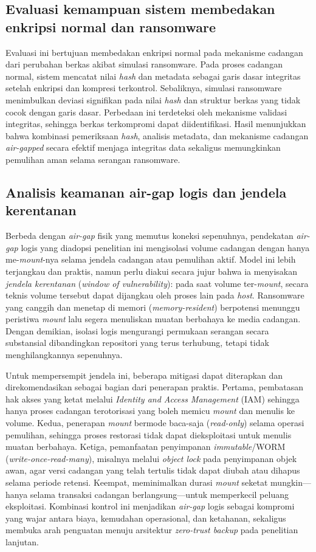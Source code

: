 \documentclass{iaesarticle}
\begin{document}
\subsection{Evaluasi kemampuan sistem membedakan enkripsi normal dan ransomware}
Evaluasi ini bertujuan membedakan enkripsi normal pada mekanisme cadangan dari perubahan berkas akibat simulasi ransomware. Pada proses cadangan normal, sistem mencatat nilai \textit{hash} dan metadata sebagai garis dasar integritas setelah enkripsi dan kompresi terkontrol. Sebaliknya, simulasi ransomware menimbulkan deviasi signifikan pada nilai \textit{hash} dan struktur berkas yang tidak cocok dengan garis dasar. Perbedaan ini terdeteksi oleh mekanisme validasi integritas, sehingga berkas terkompromi dapat diidentifikasi. Hasil menunjukkan bahwa kombinasi pemeriksaan \textit{hash}, analisis metadata, dan mekanisme cadangan \textit{air-gapped} secara efektif menjaga integritas data sekaligus memungkinkan pemulihan aman selama serangan ransomware.

\subsection{Analisis keamanan air-gap logis dan jendela kerentanan}
Berbeda dengan \textit{air-gap} fisik yang memutus koneksi sepenuhnya, pendekatan \textit{air-gap} logis yang diadopsi penelitian ini mengisolasi volume cadangan dengan hanya me-\textit{mount}-nya selama jendela cadangan atau pemulihan aktif. Model ini lebih terjangkau dan praktis, namun perlu diakui secara jujur bahwa ia menyisakan \textit{jendela kerentanan} (\textit{window of vulnerability}): pada saat volume ter-\textit{mount}, secara teknis volume tersebut dapat dijangkau oleh proses lain pada \textit{host}. Ransomware yang canggih dan menetap di memori (\textit{memory-resident}) berpotensi menunggu peristiwa \textit{mount} lalu segera menuliskan muatan berbahaya ke media cadangan. Dengan demikian, isolasi logis mengurangi permukaan serangan secara substansial dibandingkan repositori yang terus terhubung, tetapi tidak menghilangkannya sepenuhnya.

Untuk mempersempit jendela ini, beberapa mitigasi dapat diterapkan dan direkomendasikan sebagai bagian dari penerapan praktis. Pertama, pembatasan hak akses yang ketat melalui \textit{Identity and Access Management} (IAM) sehingga hanya proses cadangan terotorisasi yang boleh memicu \textit{mount} dan menulis ke volume. Kedua, penerapan \textit{mount} bermode baca-saja (\textit{read-only}) selama operasi pemulihan, sehingga proses restorasi tidak dapat dieksploitasi untuk menulis muatan berbahaya. Ketiga, pemanfaatan penyimpanan \textit{immutable}/WORM (\textit{write-once-read-many}), misalnya melalui \textit{object lock} pada penyimpanan objek awan, agar versi cadangan yang telah tertulis tidak dapat diubah atau dihapus selama periode retensi. Keempat, meminimalkan durasi \textit{mount} seketat mungkin---hanya selama transaksi cadangan berlangsung---untuk memperkecil peluang eksploitasi. Kombinasi kontrol ini menjadikan \textit{air-gap} logis sebagai kompromi yang wajar antara biaya, kemudahan operasional, dan ketahanan, sekaligus membuka arah penguatan menuju arsitektur \textit{zero-trust backup} pada penelitian lanjutan.
\end{document}
